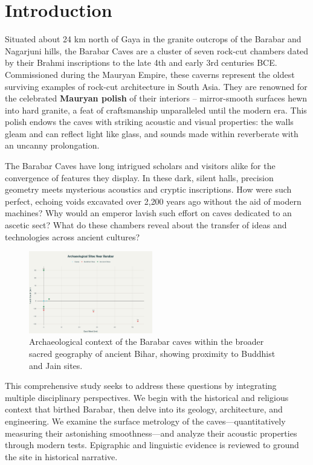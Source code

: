 \documentclass[11pt]{article}
\begin{document}
\section{Introduction}

Situated about 24 km north of Gaya in the granite outcrops of the Barabar and Nagarjuni hills, the Barabar Caves are a cluster of seven rock-cut chambers dated by their Brahmi inscriptions to the late 4th and early 3rd centuries BCE. Commissioned during the Mauryan Empire, these caverns represent the oldest surviving examples of rock-cut architecture in South Asia. They are renowned for the celebrated \textbf{Mauryan polish} of their interiors -- mirror-smooth surfaces hewn into hard granite, a feat of craftsmanship unparalleled until the modern era. This polish endows the caves with striking acoustic and visual properties: the walls gleam and can reflect light like glass, and sounds made within reverberate with an uncanny prolongation.

The Barabar Caves have long intrigued scholars and visitors alike for the convergence of features they display. In these dark, silent halls, precision geometry meets mysterious acoustics and cryptic inscriptions. How were such perfect, echoing voids excavated over 2,200 years ago without the aid of modern machines? Why would an emperor lavish such effort on caves dedicated to an ascetic sect? What do these chambers reveal about the transfer of ideas and technologies across ancient cultures?

\begin{figure}
\centering
\includegraphics[width=0.48\textwidth]{archaeological_sites_map.png}
\caption{Archaeological context of the Barabar caves within the broader sacred geography of ancient Bihar, showing proximity to Buddhist and Jain sites.}
\label{fig:sitemap}
\end{figure}

This comprehensive study seeks to address these questions by integrating multiple disciplinary perspectives. We begin with the historical and religious context that birthed Barabar, then delve into its geology, architecture, and engineering. We examine the surface metrology of the caves—quantitatively measuring their astonishing smoothness—and analyze their acoustic properties through modern tests. Epigraphic and linguistic evidence is reviewed to ground the site in historical narrative.
\end{document}
